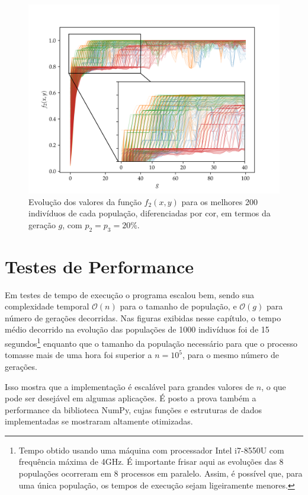 \begin{figure}[p]
  \centering
  \includegraphics[width=\textwidth]{imagens/high_prob/evolution_near_gaussians.png}
  \caption{
    Evolução dos valores da função $ f_2(x,y) $ para os
    melhores 200 indivíduos de cada população, diferenciadas por cor, em termos da geração $g$,
    com $ p_2 = p_3 = 20\% $.
  }
  \label{fig:evolution_near_gaussians_mut_20}
\end{figure}

\section{Testes de Performance}

Em testes de tempo de execução o programa escalou bem, sendo sua complexidade temporal $\mathcal{O}(n)$ para o
tamanho de população, e $\mathcal{O}(g)$ para número de gerações decorridas. 
Nas figuras exibidas nesse capítulo, o tempo médio decorrido na evolução das populações de 1000 indivíduos
foi de 15 segundos\footnote{
  Tempo obtido usando uma máquina com processador Intel i7-8550U com frequência máxima de 4GHz.
  É importante frisar aqui as evoluções das 8 populações ocorreram em 8 processos em paralelo.
  Assim, é possível que, para uma única população, os tempos de execução sejam ligeiramente menores.
} enquanto que o tamanho da população necessário para que o processo tomasse mais de uma hora foi
superior a $n = 10^5$, para o mesmo número de gerações.

Isso mostra que a implementação é escalável para grandes valores de $n$, o que pode ser desejável em
algumas aplicações. É posto a prova também a performance da biblioteca NumPy, cujas funções e estruturas
de dados implementadas se mostraram altamente otimizadas.